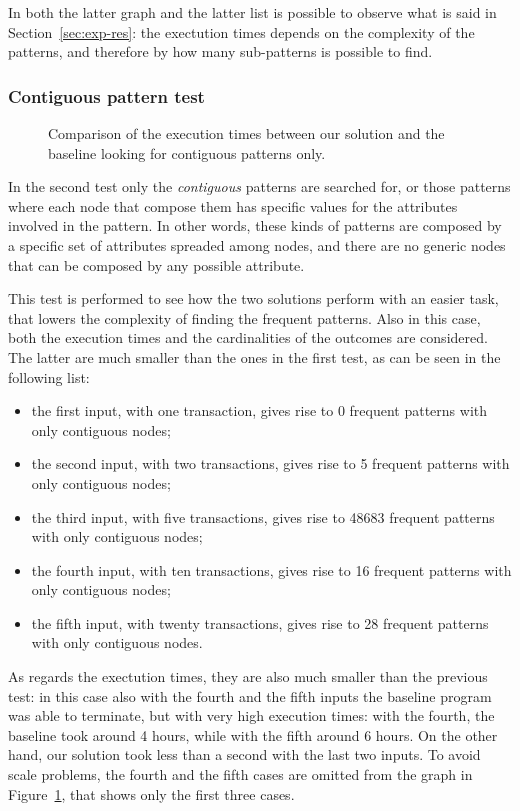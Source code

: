 \documentclass{acm_proc_article-sp-sigmod09}
\begin{document}
In both the latter graph and the latter list is possible to observe what is said in Section~\ref{sec:exp-res}: the exectution times depends on the complexity of the patterns, and therefore by how many sub-patterns is possible to find.

\subsubsection{Contiguous pattern test}

\begin{figure}
\centering
{}
\caption{Comparison of the execution times between our solution and the baseline looking for contiguous patterns only.}
\label{fig:testtwo}
\end{figure}

In the second test only the \emph{contiguous} patterns are searched for, or those patterns where each node that compose them has specific values for the attributes involved in the pattern. In other words, these kinds of patterns are composed by a specific set of attributes spreaded among nodes, and there are no generic nodes that can be composed by any possible attribute.

This test is performed to see how the two solutions perform with an easier task, that lowers the complexity of finding the frequent patterns. Also in this case, both the execution times and the cardinalities of the outcomes are considered. The latter are much smaller than the ones in the first test, as can be seen in the following list:
\begin{itemize}
\item the first input, with one transaction, gives rise to 0 frequent patterns with only contiguous nodes;
\item the second input, with two transactions, gives rise to 5 frequent patterns with only contiguous nodes;
\item the third input, with five transactions, gives rise to 48683 frequent patterns with only contiguous nodes;
\item the fourth input, with ten transactions, gives rise to 16 frequent patterns with only contiguous nodes;
\item the fifth input, with twenty transactions, gives rise to 28 frequent patterns with only contiguous nodes.
\end{itemize}

As regards the exectution times, they are also much smaller than the previous test: in this case also with the fourth and the fifth inputs the baseline program was able to terminate, but with very high execution times: with the fourth, the baseline took around 4 hours, while with the fifth around 6 hours. On the other hand, our solution took less than a second with the last two inputs. To avoid scale problems, the fourth and the fifth cases are omitted from the graph in Figure~\ref{fig:testtwo}, that shows only the first three cases. 
\end{document}
